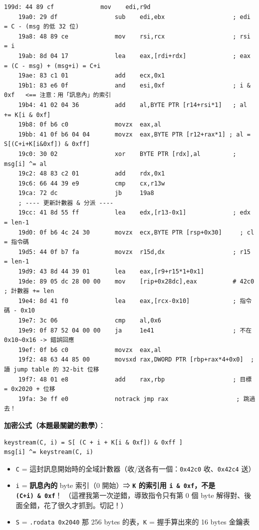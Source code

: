 \documentclass[10pt,a4paper]{article}
\providecommand{\tightlist}{%
  \setlength{\itemsep}{0pt}\setlength{\parskip}{0pt}}
\begin{document}
\begin{Verbatim}[breaklines=true,breakanywhere=true,breakautoindent=false,fontsize=\fontsize{7.0}{9.5}\selectfont]
    199d: 44 89 cf             mov    edi,r9d
    19a0: 29 df                sub    edi,ebx                   ; edi = C - (msg 的低 32 位)
    19a8: 48 89 ce             mov    rsi,rcx                   ; rsi = i
    19ab: 8d 04 17             lea    eax,[rdi+rdx]             ; eax = (C - msg) + (msg+i) = C+i
    19ae: 83 c1 01             add    ecx,0x1
    19b1: 83 e6 0f             and    esi,0xf                   ; i & 0xf   <== 注意：用「訊息內」的索引
    19b4: 41 02 04 36          add    al,BYTE PTR [r14+rsi*1]   ; al += K[i & 0xf]
    19b8: 0f b6 c0             movzx  eax,al
    19bb: 41 0f b6 04 04       movzx  eax,BYTE PTR [r12+rax*1] ; al = S[(C+i+K[i&0xf]) & 0xff]
    19c0: 30 02                xor    BYTE PTR [rdx],al         ; msg[i] ^= al
    19c2: 48 83 c2 01          add    rdx,0x1
    19c6: 66 44 39 e9          cmp    cx,r13w
    19ca: 72 dc                jb     19a8
    ; ---- 更新計數器 & 分派 ----
    19cc: 41 8d 55 ff          lea    edx,[r13-0x1]             ; edx = len-1
    19d0: 0f b6 4c 24 30       movzx  ecx,BYTE PTR [rsp+0x30]     ; cl = 指令碼
    19d5: 44 0f b7 fa          movzx  r15d,dx                   ; r15 = len-1
    19d9: 43 8d 44 39 01       lea    eax,[r9+r15*1+0x1]
    19de: 89 05 dc 28 00 00    mov    [rip+0x28dc],eax          # 42c0  ; 計數器 += len
    19e4: 8d 41 f0             lea    eax,[rcx-0x10]            ; 指令碼 - 0x10
    19e7: 3c 06                cmp    al,0x6
    19e9: 0f 87 52 04 00 00    ja     1e41                      ; 不在 0x10~0x16 -> 錯誤回應
    19ef: 0f b6 c0             movzx  eax,al
    19f2: 48 63 44 85 00       movsxd rax,DWORD PTR [rbp+rax*4+0x0]  ; 讀 jump table 的 32-bit 位移
    19f7: 48 01 e8             add    rax,rbp                   ; 目標 = 0x2020 + 位移
    19fa: 3e ff e0             notrack jmp rax                   ; 跳過去！
\end{Verbatim}

\textbf{加密公式（本題最關鍵的數學）}：

\begin{Verbatim}[breaklines=true,breakanywhere=true,breakautoindent=false,fontsize=\fontsize{7.0}{9.5}\selectfont]
keystream(C, i) = S[ (C + i + K[i & 0xf]) & 0xff ]
msg[i] ^= keystream(C, i)
\end{Verbatim}

\begin{itemize}
\tightlist
\item
  \texttt{C} =
  這封訊息開始時的全域計數器（收/送各有一個：\texttt{0x42c0}
  收、\texttt{0x42c4} 送）
\item
  \texttt{i} = \textbf{訊息內的} byte 索引（0 開始）⇒ \textbf{\texttt{K}
  的索引用 \texttt{i\ \allowbreak{}\&\allowbreak{}\ \allowbreak{}0xf}，不是 \texttt{(C+i)\ \allowbreak{}\&\allowbreak{}\ \allowbreak{}0xf}}！
  （這裡我第一次逆錯，導致指令只有第 0 個 byte
  解得對、後面全錯，花了很久才抓到。切記！）
\item
  \texttt{S} = \texttt{.\allowbreak{}rodata\ \allowbreak{}0x2040} 那 256 bytes 的表，\texttt{K} =
  握手算出來的 16 bytes 金鑰表
\end{itemize}
\end{document}

